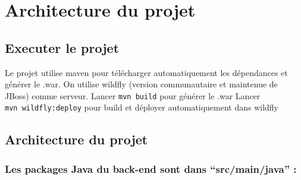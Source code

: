 \documentclass[french]{article}
\begin{document}

\section{Architecture du projet}

\subsection{Executer le projet}\label{executer-le-projet}

Le projet utilise maven pour télécharger automatiquement les dépendances
et générer le .war. On utilise wildfly (version communautaire et
maintenue de JBoss) comme serveur. Lancer \texttt{mvn\ build} pour
générer le .war Lancer \texttt{mvn\ wildfly:deploy} pour build et
déployer automatiquement dans wildfly

\subsection{Architecture du projet}\label{architecture-du-projet}

\subsubsection{Les packages Java du back-end sont dans ``src/main/java'' :}
\end{document}
